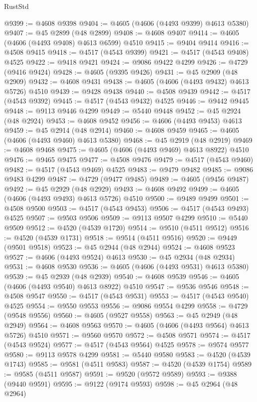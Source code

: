 \begin{lexlean}{RustStd}
\begin{coremodule}
@9399 := @4608 @9398
@9404 := @4605 (@4606 (@4493 @9399) @4613 @5380)
@9407 := @45 @2899 (@48 @2899)
@9408 := @4608 @9407
@9414 := @4605 (@4606 (@4493 @9408) @4613 @6599) @4510
@9415 := @9404 @9414
@9416 := @4508 @9415
@9418 := @4517 (@4543 @9399)
@9421 := @4517 (@4543 @9408) @4525
@9422 := @9418 @9421
@9424 := @9086 @9422 @4299
@9426 := @4729 (@9416 @9424)
@9428 := @4605 (@9395 @9426)
@9431 := @45 @2909 (@48 @2909)
@9432 := @4608 @9431
@9438 := @4605 (@4606 (@4493 @9432) @4613 @5726) @4510
@9439 := @9428 @9438
@9440 := @4508 @9439
@9442 := @4517 (@4543 @9392)
@9445 := @4517 (@4543 @9432) @4525
@9446 := @9442 @9445
@9448 := @9113 @9446 @4299
@9449 := @5440 @9448
@9452 := @45 @2924 (@48 @2924)
@9453 := @4608 @9452
@9456 := @4606 (@4493 @9453) @4613
@9459 := @45 @2914 (@48 @2914)
@9460 := @4608 @9459
@9465 := @4605 (@4606 (@4493 @9460) @4613 @5380)
@9468 := @45 @2919 (@48 @2919)
@9469 := @4608 @9468
@9475 := @4605 (@4606 (@4493 @9469) @4613 @8922) @4510
@9476 := @9465 @9475
@9477 := @4508 @9476
@9479 := @4517 (@4543 @9460)
@9482 := @4517 (@4543 @9469) @4525
@9483 := @9479 @9482
@9485 := @9086 @9483 @4299
@9487 := @4729 (@9477 @9485)
@9489 := @4605 (@9456 @9487)
@9492 := @45 @2929 (@48 @2929)
@9493 := @4608 @9492
@9499 := @4605 (@4606 (@4493 @9493) @4613 @5726) @4510
@9500 := @9489 @9499
@9501 := @4508 @9500
@9503 := @4517 (@4543 @9453)
@9506 := @4517 (@4543 @9493) @4525
@9507 := @9503 @9506
@9509 := @9113 @9507 @4299
@9510 := @5440 @9509
@9512 := @4520 (@4539 @1720)
@9514 := @9510 (@4511 @9512)
@9516 := @4520 (@4539 @1731)
@9518 := @9514 (@4511 @9516)
@9520 := @9449 (@9501 @9518)
@9523 := @45 @2944 (@48 @2944)
@9524 := @4608 @9523
@9527 := @4606 (@4493 @9524) @4613
@9530 := @45 @2934 (@48 @2934)
@9531 := @4608 @9530
@9536 := @4605 (@4606 (@4493 @9531) @4613 @5380)
@9539 := @45 @2939 (@48 @2939)
@9540 := @4608 @9539
@9546 := @4605 (@4606 (@4493 @9540) @4613 @8922) @4510
@9547 := @9536 @9546
@9548 := @4508 @9547
@9550 := @4517 (@4543 @9531)
@9553 := @4517 (@4543 @9540) @4525
@9554 := @9550 @9553
@9556 := @9086 @9554 @4299
@9558 := @4729 (@9548 @9556)
@9560 := @4605 (@9527 @9558)
@9563 := @45 @2949 (@48 @2949)
@9564 := @4608 @9563
@9570 := @4605 (@4606 (@4493 @9564) @4613 @5726) @4510
@9571 := @9560 @9570
@9572 := @4508 @9571
@9574 := @4517 (@4543 @9524)
@9577 := @4517 (@4543 @9564) @4525
@9578 := @9574 @9577
@9580 := @9113 @9578 @4299
@9581 := @5440 @9580
@9583 := @4520 (@4539 @1743)
@9585 := @9581 (@4511 @9583)
@9587 := @4520 (@4539 @1754)
@9589 := @9585 (@4511 @9587)
@9591 := @9520 (@9572 @9589)
@9593 := @9388 (@9440 @9591)
@9595 := @9122 (@9174 @9593)
@9598 := @45 @2964 (@48 @2964)

\end{coremodule}
\end{lexlean}
